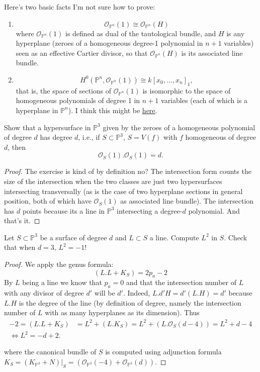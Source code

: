 \medskip\noindent
Here's two basic facts I'm not sure how to prove:
\begin{enumerate}
\item 
$$
\mathcal{O}_{\mathbb{P}^n}(1)\cong \mathcal{O}_{\mathbb{P}^n}(H)
$$
where $\mathcal{O}_{\mathbb{P}^n}(1)$ is defined
as dual of the tautological bundle,
and $H$ is any hyperplane (zeroes of a homogeneous degree-1 polynomial
in $n+1$ variables) seen as an effective Cartier divisor,
so that $\mathcal{O}_{\mathbb{P}^n}(H)$ is its associated line bundle.

\item 
$$
H^0(\mathbb{P}^n,\mathcal{O}_{\mathbb{P}^n}(1))
\cong
k[x_0,…,x_n]_1,
$$
that is, the space of sections of $\mathcal{O}_{\mathbb{P}^n}(1)$ 
is isomorphic to the space of homogeneous polynomials
of degree 1 in $n+1$ variables
(each of which is a hyperplane in $\mathbb{P}^n$).
I think this might be
\href{https://www.youtube.com/live/bXhgeRZMu8M?si=5BPdnECUREsCUwpV&t=4601}{
here}.
\end{enumerate}

\begin{exercise}
\label{exercise-degree-d-surface}
Show that a hypersurface in $\mathbb{P}^3$ 
given by the zeroes of a homogeneous polynomial
of degree $d$ has degree $d$,
i.e., if $S \subset \mathbb{P}^3$, $S=V(f)$ with
$f$ homogeneous of degree $d$,
then
 $$
\mathcal{O}_S(1).\mathcal{O}_S(1)=d.
$$
\end{exercise}

\begin{proof}
The exercise is kind of by definition no? 
The intersection form counts the size of the intersection when 
the two classes are just two hypersurfaces 
intersecting transversally (as is the case of two 
hyperplane sections in general position, 
both of which have $\mathcal{O}_S(1)$ as 
associated line bundle). The intersection 
has $d$ points because its a line in $\mathbb{P}^3$
intersecting a degree-$d$ polynomial. 
And that's it.
\end{proof}

\begin{exercise}
\label{exercise-intersection-lines}
Let $S \subset \mathbb{P}^3$ be a surface
of degree $d$ and $L \subset S$ a line.
Compute $L^2$ in $S$. Check that when $d=3$, $L^2=-1$!
\end{exercise}

\begin{proof}
We apply the genus formula:
$$
(L.L+K_S)=2p_a-2
$$
By $L$ being a line we know that $p_a=0$
and that the intersection number of $L$
with any divisor of degree $d'$ will be $d'$.
Indeed, $L.d'H=d'(L.H)=d'$
because $L.H$ is the degree of the line
(by definition of degree, namely
the intersection number of $L$ with as many
hyperplanes as its dimension).
Thus
\begin{align*}
-2=(L.L+K_S)&=L^2+(L.K_S)=L^2+(L.\mathcal{O}_S(d-4))
=L^2+d-4\\
\iff L^2=-d+2.
\end{align*}

\noindent
where the canonical bundle of $S$
is computed using adjunction formula
$K_S=(K_{\mathbb{P}^3}+N)|_S
=(\mathcal{O}_{\mathbb{P}^3}(-4)+\mathcal{O}_{\mathbb{P}^3}(d))$.
\end{proof}

